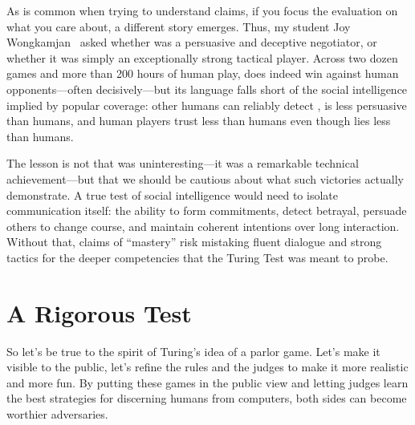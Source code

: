 As is common when trying to understand  claims, if you focus the
evaluation on what you care about, a different story emerges.
%
Thus, my student Joy Wongkamjan~\citep{Wongkamjan-24} asked whether
 was a persuasive and deceptive negotiator, or whether it was
simply an exceptionally strong tactical player.
%
Across two dozen games and more than 200 hours of human play, 
does indeed win against human opponents---often decisively---but its
language falls short of the social intelligence implied by popular
coverage: other humans can reliably detect ,  is
less persuasive than humans, and human players trust
 less than humans even though  lies less than
humans.

The lesson is not that  was uninteresting---it was a remarkable
technical achievement---but that we should be cautious about what such
victories actually demonstrate.
%
A true test of social intelligence would need to isolate communication
itself: the ability to form commitments, detect betrayal, persuade
others to change course, and maintain coherent intentions over long
interaction.
%
Without that, claims of ``mastery'' risk mistaking fluent dialogue and
strong tactics for the deeper competencies that the Turing Test was
meant to probe.

\section{A Rigorous Test}
\label{sec:turing:test}

So let’s be true to the spirit of Turing’s idea of a parlor game.
%
Let’s make it visible to the public, let’s refine the rules and the
judges to make it more realistic and more fun.
%
By putting these games in the public view and letting judges learn the
best strategies for discerning humans from computers, both sides can
become worthier adversaries.


